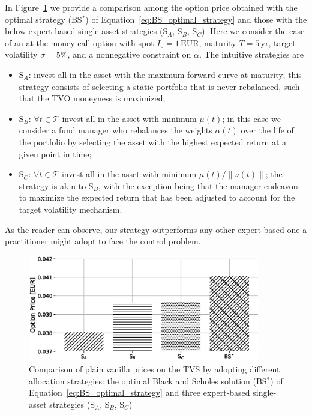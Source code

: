 \documentclass[runningheads]{m2ef}
\begin{document}
	In Figure~\ref{fig:strategy_price_comparison} we provide a comparison among the option price obtained with the optimal strategy (BS$^*$) of Equation~\eqref{eq:BS_optimal_strategy} and those with the below expert-based single-asset strategies (S$_A$, S$_B$, S$_C$). Here we consider the case of an at-the-money call option with spot $I_0 = 1\, \text{EUR}$, maturity $T=5 \, \text{yr}$, target volatility $\bar{\sigma}=5\%$, and a nonnegative constraint on $\alpha$. The intuitive strategies are
	\begin{itemize}
	\item S$_A$: invest all in the asset with the maximum forward curve at maturity; this strategy consists of selecting a static portfolio that is never rebalanced, such that the TVO moneyness is maximized;
	\item S$_B$: $\forall t \in \mathcal{T}$ invest all in the asset with minimum $\mu(t)$; in this case we consider a fund manager who rebalances the weights $\alpha(t)$ over the life of the portfolio by selecting the asset with the highest expected return at a given point in time;
	\item S$_C$: $\forall t \in \mathcal{T}$ invest all in the asset with minimum $\mu(t)/\|\nu(t)\|$; the strategy is akin to S$_B$, with the exception being that the manager endeavors to maximize the expected return that has been adjusted to account for the target volatility mechanism.
	\end{itemize}
	As the reader can observe, our strategy outperforms any other expert-based one a practitioner might adopt to face the control problem.
	\begin{figure}[t]
		\centering
		\includegraphics[width=4in]{strategy_price_comparison_grey.eps}
		\caption{Comparison of plain vanilla prices on the TVS by adopting different allocation strategies: the optimal Black and Scholes solution (BS$^*$) of Equation~\eqref{eq:BS_optimal_strategy} and three expert-based single-asset strategies (S$_A$, S$_B$, S$_C$)}
		\label{fig:strategy_price_comparison}
	\end{figure} 
\end{document}
